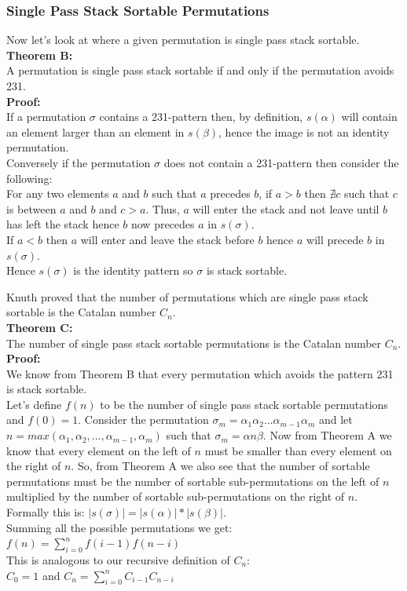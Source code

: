 \documentclass[12pt]{article}
\begin{document}
\subsubsection{Single Pass Stack Sortable Permutations}
Now let's look at where a given permutation is single pass stack sortable. \cite{BonaStackSort}
{\bf Theorem B:}\\
A permutation is single pass stack sortable if and only if the permutation avoids 231.\\
{\bf Proof:}\\
If a permutation $\sigma$ contains a 231-pattern then, by definition, $s(\alpha)$ will contain an element larger than an element in $s(\beta)$, hence the image is not an identity permutation.\\
Conversely if the permutation $\sigma$ does not contain a 231-pattern then consider the following:\\
For any two elements $a$ and $b$ such that $a$ precedes $b$, if $a > b$ then $\nexists c$ such that $c$ is between $a$ and $b$ and $c > a$. Thus, $a$ will enter the stack and not leave until $b$ has left the stack hence $b$ now precedes $a$ in $s(\sigma)$.\\
If $a < b$ then $a$ will enter and leave the stack before $b$ hence $a$ will precede $b$ in $s(\sigma)$.\\
Hence $s(\sigma)$ is the identity pattern so $\sigma$ is stack sortable. \square

Knuth proved that the number of permutations which are single pass stack sortable is the Catalan number $C_{n}$.\cite{StackLim}\\
{\bf Theorem C:}\\
The number of single pass stack sortable permutations is the Catalan number $C_{n}$.\\
{\bf Proof:}\\
We know from Theorem B that every permutation which avoids the pattern 231 is stack sortable.\\
Let's define $f(n)$ to be the number of single pass stack sortable permutations and $f(0) = 1$. Consider the permutation $\sigma_{m} = \alpha_{1}\alpha_{2}...\alpha_{m-1}\alpha_{m}$ and let $n = max(\alpha_{1}, \alpha_{2}, ..., \alpha_{m-1}, \alpha_{m})$ such that $\sigma_{m} = \alpha n \beta$. Now from Theorem A we know that every element on the left of $n$ must be smaller than every element on the right of $n$. So, from Theorem A we also see that the number of sortable permutations must be the number of sortable sub-permutations on the left of $n$ multiplied by the number of sortable sub-permutations on the right of $n$. Formally this is: $|s(\sigma)| = |s(\alpha)| * |s(\beta)|$.\\
Summing all the possible permutations we get:\\
$f(n) = \sum_{i=0}^{n}f(i-1) f(n-i)$\\
This is analogous to our recursive definition of $C_{n}$:\\
$C_{0} = 1$ and $C_{n} = \sum_{i=0}^{n}C_{i-1} C_{n-i}$\\
\square
\end{document}
